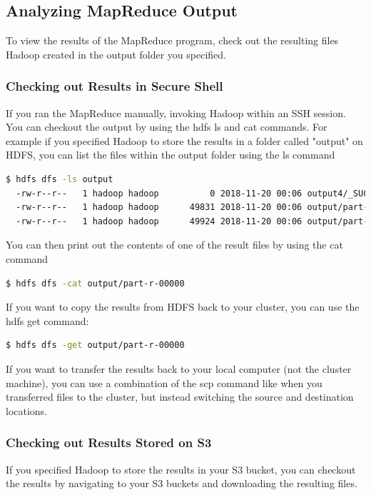 \documentclass{article}
\begin{document}
\subsection{Analyzing MapReduce Output}
To view the results of the MapReduce program, check out the resulting files Hadoop created in the output folder you specified.
\subsubsection{Checking out Results in Secure Shell}
If you ran the MapReduce manually, invoking Hadoop within an SSH session. You can checkout the output by using the hdfs ls and cat commands.
For example if you specified Hadoop to store the results in a folder called "output" on HDFS, you can list the files within the output folder using the ls command
\begin{lstlisting}[language=bash]
  $ hdfs dfs -ls output
  -rw-r--r--   1 hadoop hadoop          0 2018-11-20 00:06 output4/_SUCCESS
  -rw-r--r--   1 hadoop hadoop      49831 2018-11-20 00:06 output/part-r-00000
  -rw-r--r--   1 hadoop hadoop      49924 2018-11-20 00:06 output/part-r-00001
\end{lstlisting}
You can then print out the contents of one of the result files by using the cat command
\begin{lstlisting}[language=bash]
  $ hdfs dfs -cat output/part-r-00000
\end{lstlisting}
If you want to copy the results from HDFS back to your cluster, you can use the hdfs get command:
 \begin{lstlisting}[language=bash]
  $ hdfs dfs -get output/part-r-00000
\end{lstlisting} 
If you want to transfer the results back to your local computer (not the cluster machine), you can use a combination of the scp command like when you transferred files to the cluster, but instead switching the source and destination locations.

\subsubsection{Checking out Results Stored on S3}
If you specified Hadoop to store the results in your S3 bucket, you can checkout the results by navigating to your S3 buckets and downloading the resulting files.


\end{document}
